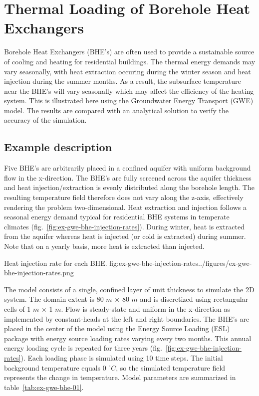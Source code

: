 \section{Thermal Loading of Borehole Heat Exchangers}

Borehole Heat Exchangers (BHE's) are often used to provide a sustainable source of cooling and heating for residential buildings. The thermal energy demands may vary seasonally, with heat extraction occuring during the winter season and heat injection during the summer months. As a result, the subsurface temperature near the BHE's will vary seasonally which may affect the efficiency of the heating system. This is illustrated here using the Groundwater Energy Transport (GWE) model. The results are compared with an analytical solution to verify the accuracy of the \mf simulation. 

\subsection{Example description}

Five BHE's are arbitrarily placed in a confined aquifer with uniform background flow in the x-direction. The BHE's are fully screened across the aquifer thickness and heat injection/extraction is evenly distributed along the borehole length. The resulting temperature field therefore does not vary along the z-axis, effectively rendering the problem two-dimensional. Heat extraction and injection follows a seasonal energy demand typical for residential BHE systems in temperate climates (fig.~\ref{fig:ex-gwe-bhe-injection-rates}). During winter, heat is extracted from the aquifer whereas heat is injected (or cold is extracted) during summer. Note that on a yearly basis, more heat is extracted than injected.

\begin{StandardFigure}{
    Heat injection rate for each BHE.
    }{fig:ex-gwe-bhe-injection-rates}{../figures/ex-gwe-bhe-injection-rates.png}
\end{StandardFigure}                                 

The \mf model consists of a single, confined layer of unit thickness to simulate the 2D system. The domain extent is 80 $m$ $\times$ 80 $m$ and is discretized using rectangular cells of 1 $m$ $\times$ 1 $m$. Flow is steady-state and uniform in the x-direction as implemented by constant-heads at the left and right boundaries. The BHE's are placed in the center of the model using the Energy Source Loading (ESL) package with energy source loading rates varying every two months. This annual energy loading cycle is repeated for three years (fig.~\ref{fig:ex-gwe-bhe-injection-rates}). Each loading phase is simulated using 10 time steps. The initial background temperature equals 0 $^{\circ} C$, so the simulated temperature field represents the change in temperature. Model parameters are summarized in table~\ref{tab:ex-gwe-bhe-01}.

